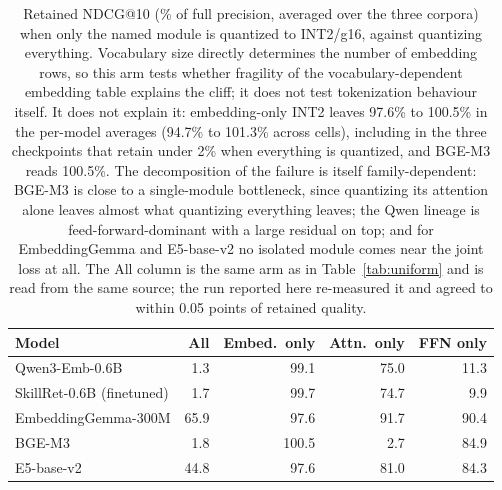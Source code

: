 \begin{table}[t]\centering\small
\caption{Retained NDCG@10 (\% of full precision, averaged over the three corpora) when only
the named module is quantized to INT2/g16, against quantizing everything. Vocabulary size
directly determines the number of embedding rows, so this arm tests whether fragility of the
vocabulary-dependent embedding table explains the cliff; it does not test tokenization
behaviour itself. It does not explain it: embedding-only INT2 leaves 97.6\% to 100.5\% in the
per-model averages (94.7\% to 101.3\% across cells), including in the three checkpoints that
retain under 2\% when everything is quantized, and BGE-M3 reads 100.5\%. The decomposition of
the failure is itself family-dependent: BGE-M3 is close to a single-module bottleneck, since
quantizing its attention alone leaves almost what quantizing everything leaves; the Qwen
lineage is feed-forward-dominant with a large residual on top; and for EmbeddingGemma and
E5-base-v2 no isolated module comes near the joint loss at all. The All column is the same arm as in
Table~\ref{tab:uniform} and is read from the same source; the run reported here
re-measured it and agreed to within 0.05 points of retained quality.}
\label{tab:int2mod}
\begin{tabular}{lrrrr}
\toprule
Model & All & Embed.\ only & Attn.\ only & FFN only \\
\midrule
Qwen3-Emb-0.6B & 1.3 & 99.1 & 75.0 & 11.3 \\
SkillRet-0.6B (finetuned) & 1.7 & 99.7 & 74.7 & 9.9 \\
EmbeddingGemma-300M & 65.9 & 97.6 & 91.7 & 90.4 \\
BGE-M3 & 1.8 & 100.5 & 2.7 & 84.9 \\
E5-base-v2 & 44.8 & 97.6 & 81.0 & 84.3 \\
\bottomrule
\end{tabular}\end{table}